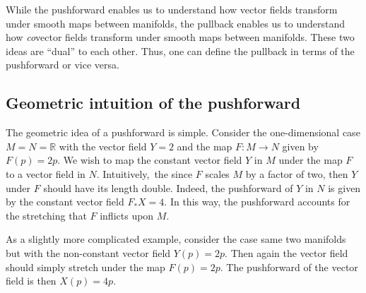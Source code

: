 \documentclass[12pt,letterpaper,boxed]{article}
\newcommand{\R}{{\mathbb{R}}}
\begin{document}
While the pushforward enables us to understand how vector fields transform under smooth maps between manifolds, the pullback enables us to understand how \textit{co}vector fields transform under smooth maps between manifolds. These two ideas are ``dual'' to each other. Thus, one can define the pullback in terms of the pushforward or vice versa.

\subsection{Geometric intuition of the pushforward}

The geometric idea of a pushforward is simple. Consider the one-dimensional case $M = N = \R$ with the vector field $Y = 2$ and the map $F : M \to N$ given by $F(p) = 2p$. We wish to map the constant vector field $Y$ in $M$ under the map $F$ to a vector field in $N$. Intuitively, the since $F$ scales $M$ by a factor of two, then $Y$ under $F$ should have its length double. Indeed, the pushforward of $Y$ in $N$ is given by the constant vector field $F_* X = 4$. In this way, the pushforward accounts for the stretching that $F$ inflicts upon $M$.

As a slightly more complicated example, consider the case same two manifolds but with the non-constant vector field $Y(p) = 2p$. Then again the vector field should simply stretch under the map $F(p) = 2p$. The pushforward of the vector field is then $X(p) = 4p$.
\end{document}
